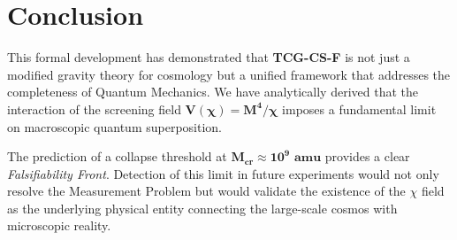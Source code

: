 \documentclass[11pt, a4paper]{article}
\begin{document}
\section{Conclusion}

This formal development has demonstrated that \textbf{TCG-CS-F} is not just a modified gravity theory for cosmology but a unified framework that addresses the completeness of Quantum Mechanics. We have analytically derived that the interaction of the screening field $\mathbf{V(\chi)=M^4/\chi}$ imposes a fundamental limit on macroscopic quantum superposition.

The prediction of a collapse threshold at $\mathbf{M_{cr} \approx 10^9 \text{ amu}}$ provides a clear \textit{Falsifiability Front}. Detection of this limit in future experiments would not only resolve the Measurement Problem but would validate the existence of the $\chi$ field as the underlying physical entity connecting the large-scale cosmos with microscopic reality.
\end{document}
